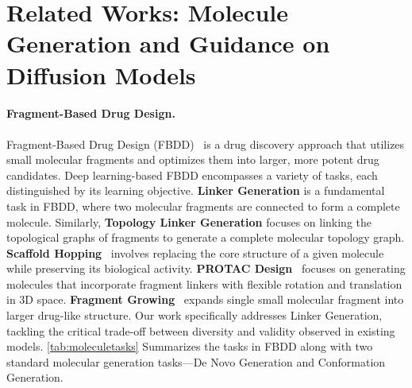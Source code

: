 \section{Related Works: Molecule Generation and Guidance on Diffusion Models}
\label{app:relatedwork}
\paragraph{Fragment-Based Drug Design.} Fragment-Based Drug Design (FBDD)~\citep{jin2023fflom,igashov2024difflinker,diffhop,imrie2020delinker,huang2022_3dlinker} is a drug discovery approach that utilizes small molecular fragments and optimizes them into larger, more potent drug candidates. Deep learning-based FBDD encompasses a variety of tasks, each distinguished by its learning objective. \textbf{Linker Generation} \citep{igashov2024difflinker,huang2022_3dlinker} is a fundamental task in FBDD, where two molecular fragments are connected to form a complete molecule. Similarly, \textbf{Topology Linker Generation} \citep{jin2023fflom,imrie2020delinker,zhang2024grelinker} focuses on linking the topological graphs of fragments to generate a complete molecular topology graph. \textbf{Scaffold Hopping}~\citep{diffhop,decompopt} involves replacing the core structure of a given molecule while preserving its biological activity. \textbf{PROTAC Design}~\citep{guan2024linkernet,kao2023_aimlinker} focuses on generating molecules that incorporate fragment linkers with flexible rotation and translation in 3D space. \textbf{Fragment Growing}~\citep{moler,autofragdiff} expands single small molecular fragment into larger drug-like structure. Our work specifically addresses Linker Generation, tackling the critical trade-off between diversity and validity observed in existing models. \cref{tab:moleculetasks} Summarizes the tasks in FBDD along with two standard molecular generation tasks—De Novo Generation and Conformation Generation.

